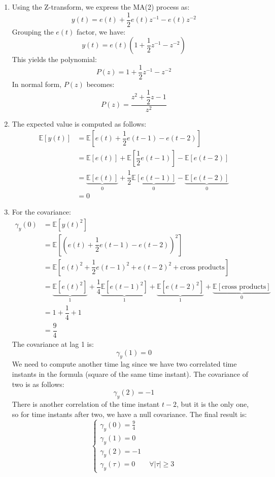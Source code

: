 \begin{enumerate}
    \item Using the Z-transform, we express the MA(2) process as:
        \[y(t)=e(t)+\dfrac{1}{2}e(t)z^{-1}-e(t)z^{-2}\]
        Grouping the $e(t)$ factor, we have:
        \[y(t)=e(t)\left(1+\dfrac{1}{2}z^{-1}-z^{-2}\right)\]
        This yields the polynomial:
        \[P(z)=1+\dfrac{1}{2}z^{-1}-z^{-2}\]
        In normal form, $P(z)$ becomes:
        \[P(z)=\dfrac{z^2+\dfrac{1}{2}z-1}{z^2}\]
    \item The expected value is computed as follows:
        \begin{align*}
            \mathbb{E}\left[y(t)\right]     &= \mathbb{E}\left[e(t)+\dfrac{1}{2}e(t-1)-e(t-2)\right] \\
                                            &= \mathbb{E}\left[e(t)\right]+\mathbb{E}\left[\dfrac{1}{2}e(t-1)\right]-\mathbb{E}\left[e(t-2)\right] \\
                                            &= \underbrace{\mathbb{E}\left[e(t)\right]}_0 +\dfrac{1}{2}\underbrace{\mathbb{E}\left[e(t-1)\right]}_0 -\underbrace{\mathbb{E}\left[e(t-2)\right]}_0  \\
                                            &= 0
        \end{align*}
    \item For the covariance:
        \begin{align*}
            \gamma_y(0)     &= \mathbb{E}\left[y(t)^2\right] \\
                            &= \mathbb{E}\left[\left( e(t)+\dfrac{1}{2}e(t-1)-e(t-2) \right)^2\right] \\
                            &= \mathbb{E}\left[ e(t)^2 + \dfrac{1}{2}e(t-1)^2 + e(t-2)^2  + \text{cross products} \right] \\
                            &= \underbrace{\mathbb{E}\left[ e(t)^2 \right]}_1  + \dfrac{1}{4}\underbrace{\mathbb{E}\left[e(t-1)^2\right]}_1  + \underbrace{\mathbb{E}\left[e(t-2)^2\right]}_1  + \underbrace{\mathbb{E}\left[\text{cross products}\right]}_0  \\
                            &= 1  + \dfrac{1}{4} + 1\\
                            &= \dfrac{9}{4}
        \end{align*}
        The covariance at lag 1 is:
        \[\gamma_y(1)=0\]
        We need to compute another time lag since we have two correlated time instants in the formula (square of the same time instant). 
        The covariance of two is as follows:
        \[\gamma_y(2)=-1\]
        There is another correlation of the time instant $t-2$, but it is the only one, so for time instants after two, we have a null covariance.
        The final result is:
        \[\begin{cases}
            \gamma_y(0)=\frac{9}{4} \\
            \gamma_y(1)=0 \\
            \gamma_y(2)=-1 \\
            \gamma_y(\tau)=0 \qquad \forall\left\lvert \tau\right\rvert \geq 3
        \end{cases}\]
\end{enumerate}